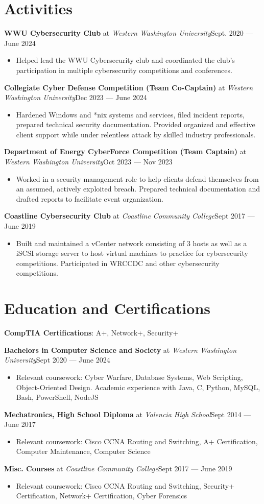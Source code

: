 \documentclass{article}
\newcommand{\topLevelItem}[4]{
    \textbf{#1} at \emph{#2}\hfill #4\newline
    \vspace{-18pt}\begin{itemize}
}
\newcommand{\certificationType}[2]{
    \textbf{#1 Certifications}: #2\vspace{2pt} \newline
}
\newcommand{\topLevelItemEnd}{\end{itemize}\vspace{5pt}}
\newcommand{\lowLevelItem}[1]{
    \item\small{#1}\vspace{-8pt}
}
\begin{document}
\section*{Activities}
\topLevelItem{WWU Cybersecurity Club}{Western Washington University}{Bellingham, WA}{Sept. 2020 — June 2024}
\lowLevelItem{Helped lead the WWU Cybersecurity club and coordinated the club’s participation in multiple cybersecurity competitions and conferences.}
\topLevelItemEnd
\topLevelItem{Collegiate Cyber Defense Competition (Team Co-Captain)}{Western Washington University}{Bellingham, WA}{Dec 2023 — June 2024}
\lowLevelItem{Hardened Windows and *nix systems and services, filed incident reports, prepared technical security documentation.  Provided organized and effective client support while under relentless attack by skilled industry professionals.}
\topLevelItemEnd
\topLevelItem{Department of Energy CyberForce Competition (Team Captain)}{Western Washington University}{Bellingham, WA}{Oct 2023 — Nov 2023}
\lowLevelItem{Worked in a security management role to help clients defend themselves from an assumed, actively exploited breach.  Prepared technical documentation and drafted reports to facilitate event organization.}
\topLevelItemEnd
\topLevelItem{Coastline Cybersecurity Club}{Coastline Community College}{Costa Mesa, CA}{Sept 2017 — June 2019}
\lowLevelItem{Built and maintained a vCenter network consisting of 3 hosts as well as a iSCSI storage server to host virtual machines to practice for cybersecurity competitions.  Participated in WRCCDC and other cybersecurity competitions.}
\topLevelItemEnd


\section*{Education and Certifications}
\certificationType{CompTIA}{A+, Network+, Security+}
\topLevelItem{Bachelors in Computer Science and Society}{Western Washington University}{Bellingham, WA}{Sept 2020 — June 2024}
\lowLevelItem{Relevant coursework: Cyber Warfare, Database Systems, Web Scripting, Object-Oriented Design.  Academic experience with Java, C, Python, MySQL, Bash, PowerShell, NodeJS}
\topLevelItemEnd
\topLevelItem{Mechatronics, High School Diploma}{Valencia High School}{Placentia, CA}{Sept 2014 — June 2017}
\lowLevelItem{Relevant coursework: Cisco CCNA Routing and Switching, A+ Certification, Computer Maintenance, Computer Science}
\topLevelItemEnd
\topLevelItem{Misc. Courses}{Coastline Community College}{Costa Mesa, CA}{Sept 2017 — June 2019}
\lowLevelItem{Relevant coursework: Cisco CCNA Routing and Switching, Security+ Certification, Network+ Certification, Cyber Forensics}
\topLevelItemEnd

\end{document}
